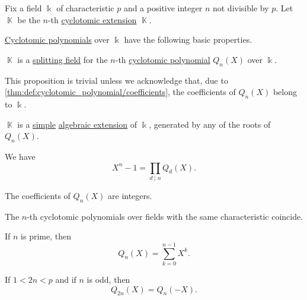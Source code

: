 \begin{proposition}\label{thm:def:cyclotomic_polynomial}
  Fix a field \( \Bbbk \) of characteristic \( p \) and a positive integer \( n \) not divisible by \( p \). Let \( \BbbK \) be the \( n \)-th \hyperref[def:cyclotomic_extension]{cyclotomic extension} \( \BbbK \).

  \hyperref[def:cyclotomic_polynomial]{Cyclotomic polynomials} over \( \Bbbk \) have the following basic properties.
  \begin{thmenum}
     \( \BbbK \) is a \hyperref[def:splitting_field]{splitting field} for the \( n \)-th \hyperref[def:cyclotomic_polynomial]{cyclotomic polynomial} \( Q_n(X) \) over \( \Bbbk \).

    \item This proposition is trivial unless we acknowledge that, due to \cref{thm:def:cyclotomic_polynomial/coefficients}, the coefficients of \( Q_n(X) \) belong to \( \Bbbk \).

     \( \BbbK \) is a \hyperref[def:simple_field_extension]{simple} \hyperref[def:algebraic_extension]{algebraic extension} of \( \Bbbk \), generated by any of the roots of \( Q_n(X) \).

     We have
    \begin{equation}\label{eq:thm:def:cyclotomic_polynomial/product}
      X^n - 1 = \prod_{d \mid n} Q_d(X).
    \end{equation}

    \cite[thm. 2.45(ii)]{LidlNiederreiter1997FiniteFields} The coefficients of \( Q_n(X) \) are integers.

     The \( n \)-th cyclotomic polynomials over fields with the same characteristic coincide.

     If \( n \) is prime, then
    \begin{equation}\label{eq:thm:def:cyclotomic_polynomial/prime}
      Q_n(X) = \sum_{k=0}^{n-1} X^k.
    \end{equation}

     If \( 1 < 2n < p \) and if \( n \) is odd, then
    \begin{equation}\label{eq:thm:def:cyclotomic_polynomial/odd}
      Q_{2n}(X) = Q_n(-X).
    \end{equation}
  \end{thmenum}
\end{proposition}

